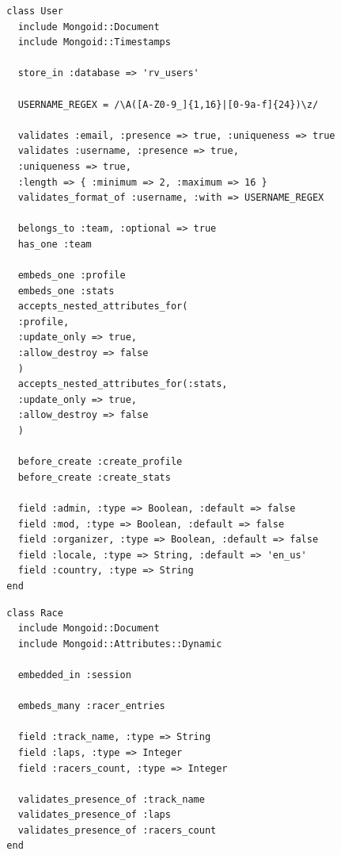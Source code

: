 \begin{listing}
  \begin{verbatim}
  class User
    include Mongoid::Document
    include Mongoid::Timestamps
    
    store_in :database => 'rv_users'
    
    USERNAME_REGEX = /\A([A-Z0-9_]{1,16}|[0-9a-f]{24})\z/
    
    validates :email, :presence => true, :uniqueness => true
    validates :username, :presence => true, 
    :uniqueness => true, 
    :length => { :minimum => 2, :maximum => 16 }
    validates_format_of :username, :with => USERNAME_REGEX
    
    belongs_to :team, :optional => true
    has_one :team
    
    embeds_one :profile
    embeds_one :stats
    accepts_nested_attributes_for(
    :profile,
    :update_only => true,
    :allow_destroy => false
    )
    accepts_nested_attributes_for(:stats,
    :update_only => true,
    :allow_destroy => false
    )
    
    before_create :create_profile
    before_create :create_stats
    
    field :admin, :type => Boolean, :default => false
    field :mod, :type => Boolean, :default => false
    field :organizer, :type => Boolean, :default => false
    field :locale, :type => String, :default => 'en_us'
    field :country, :type => String
  end
  \end{verbatim}
\end{listing}

\begin{listing}
  \begin{verbatim}
  class Race
    include Mongoid::Document
    include Mongoid::Attributes::Dynamic
    
    embedded_in :session
    
    embeds_many :racer_entries
    
    field :track_name, :type => String
    field :laps, :type => Integer
    field :racers_count, :type => Integer
    
    validates_presence_of :track_name
    validates_presence_of :laps
    validates_presence_of :racers_count
  end
  \end{verbatim}
\end{listing}

